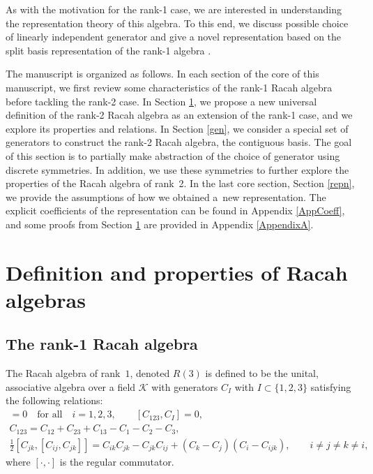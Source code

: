 \documentclass[pdftex]{sigma}
\numberwithin{equation}{section}
\begin{document}
As with the motivation for the rank-1 case, we are interested in understanding the representation theory of this algebra. To this end, we discuss possible choice of linearly independent generator and give a novel representation based on the split basis representation of the rank-1 algebra \cite{HBC2020}.



The manuscript is organized as follows. In each section of the core of this manuscript, we first review some characteristics of the rank-1 Racah algebra before tackling the rank-2 case.
In Section \ref{defn}, we propose a new universal definition of the rank-2 Racah algebra as an extension of the rank-1 case, and we explore its properties and relations. In Section \ref{gen}, we consider a special set of generators to construct the rank-2 Racah algebra, the contiguous basis. The goal of this section is to partially make abstraction of the choice of generator using discrete symmetries. In addition, we use these symmetries to further explore the properties of the Racah algebra of rank~2. In the last core section, Section \ref{repn}, we provide the assumptions of how we obtained a~new representation. The explicit coefficients of the representation can be found in Appendix \ref{AppCoeff}, and some proofs from Section \ref{defn} are provided in Appendix \ref{AppendixA}.

\section{Definition and properties of Racah algebras}
\label{defn}
\subsection{The rank-1 Racah algebra}
\begin{Definition}
The Racah algebra of rank~$1$, denoted $R(3)$ is defined to be the unital, associative algebra over a field $\mathcal{K}$ with generators $C_{I}$ with $I \subset \{ 1,2,3\}$ satisfying the following relations:
\begin{gather}
[C_{i},C_{I}] = 0 \quad \mbox{for all}\quad i=1,2,3, \qquad [C_{123},C_{I}] = 0,\label{central1}\\
C_{123}=C_{12}+C_{23}+C_{13}-C_1 -C_2-C_3, \label{R3decom}\\
\tfrac{1}{2} [C_{jk},[C_{ij}, C_{jk}]]= C_{ik}C_{jk}-C_{jk}C_{ij}+(C_k-C_j)(C_i-C_{ijk}), \qquad i\neq j \neq k\neq i,\label{quad3}
\end{gather}
where $[\cdot,\cdot]$ is the regular commutator.
\end{Definition}
\end{document}
